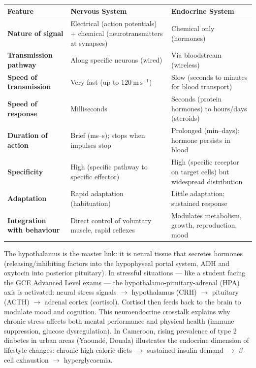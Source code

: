 \documentclass[11pt]{article}
\newcommand{\cle}[1]{{\popxbold\color{popdark}#1}}
\begin{document}
\begin{propriete}
\begin{center}
\begin{tabularx}{\linewidth}{|l|X|X|}\hline
\rowcolor{popblueL}
\textbf{Feature} & \textbf{Nervous System} & \textbf{Endocrine System} \\ \hline
\textbf{Nature of signal} & Electrical (action potentials) + chemical (neurotransmitters at synapses) & Chemical only (hormones) \\ \hline
\textbf{Transmission pathway} & Along specific neurons (wired) & Via bloodstream (wireless) \\ \hline
\textbf{Speed of transmission} & Very fast (up to $120\ \mathrm{m\,s^{-1}}$) & Slow (seconds to minutes for blood transport) \\ \hline
\textbf{Speed of response} & Milliseconds & Seconds (protein hormones) to hours/days (steroids) \\ \hline
\textbf{Duration of action} & Brief (ms--s); stops when impulses stop & Prolonged (min--days); hormone persists in blood \\ \hline
\textbf{Specificity} & High (specific pathway to specific effector) & High (specific receptor on target cells) but widespread distribution \\ \hline
\textbf{Adaptation} & Rapid adaptation (habituation) & Little adaptation; sustained response \\ \hline
\textbf{Integration with behaviour} & Direct control of voluntary muscle, rapid reflexes & Modulates metabolism, growth, reproduction, mood \\ \hline
\end{tabularx}
\end{center}
\end{propriete}

\begin{savaistu}
The \cle{hypothalamus} is the master link: it is neural tissue that secretes hormones (releasing/inhibiting factors into the hypophyseal portal system, ADH and oxytocin into posterior pituitary). In stressful situations — like a student facing the GCE Advanced Level exams — the \cle{hypothalamo-pituitary-adrenal (HPA) axis} is activated: neural stress signals $\rightarrow$ hypothalamus (CRH) $\rightarrow$ pituitary (ACTH) $\rightarrow$ adrenal cortex (cortisol). Cortisol then feeds back to the brain to modulate mood and cognition. This neuroendocrine crosstalk explains why chronic stress affects both mental performance and physical health (immune suppression, glucose dysregulation). In Cameroon, rising prevalence of type 2 diabetes in urban areas (Yaoundé, Douala) illustrates the endocrine dimension of lifestyle changes: chronic high-calorie diets $\rightarrow$ sustained insulin demand $\rightarrow$ $\beta$-cell exhaustion $\rightarrow$ hyperglycaemia.
\end{savaistu}
\end{document}
